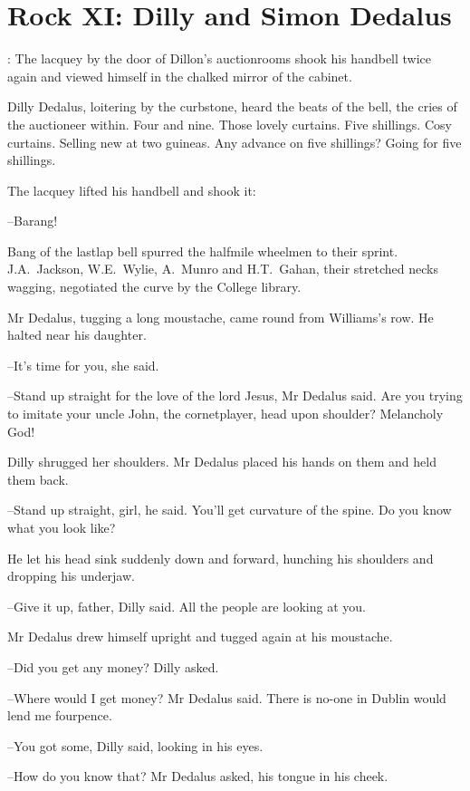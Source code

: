 \section*{Rock XI: Dilly and Simon Dedalus}


:
The lacquey by the door of Dillon's auctionrooms
shook his handbell
twice again
and viewed himself in the chalked mirror of the cabinet.

Dilly Dedalus, loitering by the curbstone,
heard the beats of the bell,
the cries of the auctioneer within.
Four and nine.
Those lovely curtains.
Five shillings.
Cosy curtains.
Selling new at two guineas.
Any advance on
five shillings?
Going for five shillings.

The lacquey lifted his handbell and shook it:

--Barang!%

Bang of the lastlap bell
spurred the halfmile wheelmen to their sprint.
J.A.~Jackson,
W.E.~Wylie,
A.~Munro
and H.T.~Gahan,
their stretched
necks wagging,
negotiated the curve by the College library.

Mr Dedalus,
tugging a long moustache,
came round from Williams's
row.
He halted near his daughter.

--It's time for you,
she said.

--Stand up straight for the love of the lord Jesus,
Mr Dedalus said.
Are
you trying to imitate your uncle John, the cornetplayer,
head upon
shoulder?
Melancholy God!

Dilly shrugged her shoulders.
Mr Dedalus placed his hands on them
and held them back.

--Stand up straight, girl,
he said.
You'll get curvature of the spine.
Do you know what you look like?

He let his head sink suddenly down and forward,
hunching his
shoulders and dropping his underjaw.

--Give it up, father,
Dilly said.
All the people are looking at you.

Mr Dedalus drew himself upright
and tugged again at his moustache.

--Did you get any money?
Dilly asked.

--Where would I get money?
Mr Dedalus said.
There is no-one in Dublin would lend me fourpence.%

--You got some,
Dilly said,
looking in his eyes.

--How do you know that?
Mr Dedalus asked,
his tongue in his cheek.

